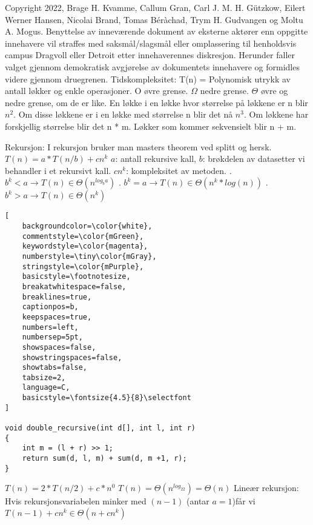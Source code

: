 \documentclass[10pt,a4paper]{article}
\begin{document}
\begin{multicols}{4}
{\fontsize{8}{8}\selectfont

\noindent
Copyright 2022, Brage H. Kvamme, Callum Gran, Carl J. M. H. Gützkow, Eilert Werner Hansen, Nicolai Brand, Tomas Béràchad, Trym H. Gudvangen og Moltu A. Mogus. Benyttelse av inneværende dokument av eksterne aktører enn oppgitte innehavere vil straffes med saksmål/slagsmål eller omplassering til henholdsvis campus Dragvoll eller Detroit etter innehaverennes diskresjon. Herunder faller valget gjennom demokratisk avgjørelse av dokumentets innehavere og formidles videre gjennom druegrenen. 
\newline
\newline
\noindent
\color{red}Tidskompleksitet\color{black}: 
\newline
T(n) = Polynomisk utrykk av antall løkker og enkle operasjoner.
O øvre grense. $\Omega$
nedre grense. $\Theta$ øvre og nedre grense, om de er like.
En løkke i en løkke hvor størrelse på løkkene er n blir $n^2$. Om disse løkkene er i en løkke med størrelse n blir det nå $n^3$. Om løkkene har forskjellig størrelse blir det n * m. Løkker som kommer sekvensielt blir n + m. 

\noindent
\color{red}Rekursjon: \color{black} I rekursjon bruker man masters theorem ved splitt og hersk.
\newline $T(n) = a*T(n/b) + cn^k$
$a$: antall rekursive kall, $b$: brøkdelen av datasetter vi behandler i et rekursivt kall. $cn^k$: kompleksitet av metoden.
. $b^k < a \rightarrow T(n) \in \Theta (n^{log_b a})$
. $b^k = a \rightarrow T(n) \in \Theta (n^k * log(n))$
. $b^k > a \rightarrow T(n) \in \Theta (n^k)$
\begin{lstlisting}[
    backgroundcolor=\color{white},   
    commentstyle=\color{mGreen},
    keywordstyle=\color{magenta},
    numberstyle=\tiny\color{mGray},
    stringstyle=\color{mPurple},
    basicstyle=\footnotesize,
    breakatwhitespace=false,         
    breaklines=true,                 
    captionpos=b,                    
    keepspaces=true,                 
    numbers=left,                    
    numbersep=5pt,                  
    showspaces=false,                
    showstringspaces=false,
    showtabs=false,                  
    tabsize=2,
    language=C,
    basicstyle=\fontsize{4.5}{8}\selectfont
]

void double_recursive(int d[], int l, int r)
{
    int m = (l + r) >> 1;
    return sum(d, l, m) + sum(d, m +1, r);
}
\end{lstlisting}
\noindent
$T(n) = 2*T(n/2) + c*n^0$
$T(n) = \Theta(n^{log_22}) = \Theta(n)$
\newline
\noindent
\color{red}Lineær rekursjon: \color{black}
\noindent Hvis rekursjonsvariabelen minker med $(n - 1)$ (antar $a=1$)får vi $T(n-1) + cn^k \in \Theta(n + cn^k)$


}
\end{multicols}
\end{document}

